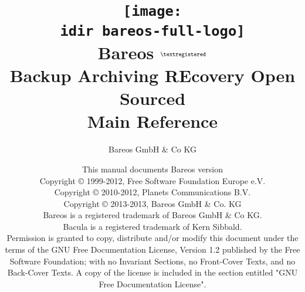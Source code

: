 
\begin{titlepage}

\title{\texttt{[image: \\idir bareos-full-logo]} \\
\Huge{Bareos} $^{\normalsize \textregistered}$\\
\huge{Backup Archiving REcovery Open Sourced}\\[2ex]
Main Reference\\
}

\author{Bareos GmbH \& Co KG}
\date{This manual documents Bareos version \version \\
      \vspace{0.2in}
      Copyright {\copyright} 1999-2012, Free Software Foundation Europe e.V. \\
      Copyright {\copyright} 2010-2012, Planets Communications B.V. \\
      Copyright {\copyright} 2013-2013, Bareos GmbH \& Co. KG \\
      Bareos {\textregistered} is a registered trademark of Bareos GmbH \& Co KG.\\
      Bacula {\textregistered} is a registered trademark of Kern Sibbald.\\
      \vspace{0.2in}
  Permission is granted to copy, distribute and/or modify this document under the terms of the
  GNU Free Documentation License, Version 1.2 published by the Free Software Foundation;
  with no Invariant Sections, no Front-Cover Texts, and no Back-Cover Texts.
  A copy of the license is included in the section entitled "GNU Free Documentation License".
}

\maketitle

\end{titlepage}
